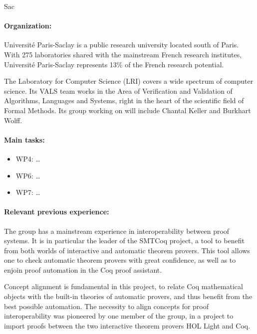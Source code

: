 \begin{sitedescription}{Sac}

\paragraph{Organization:}

Université Paris-Saclay is a public research university located south of
Paris. With 275 laboratories shared with the mainstream French research
institutes, Université Paris-Saclay represents 13\% of the French
research potential.

The Laboratory for Computer Science (LRI) covers a wide spectrum of
computer science. Its VALS team works in the Area of Verification and
Validation of Algorithms, Languages and Systems, right in the heart of
the scientific field of Formal Methods. Its group working on \pn will
include Chantal Keller and Burkhart Wolff.

\paragraph{Main tasks:}

\begin{itemize}
\item WP4: \dots
\item WP6: \dots
\item WP7: \dots
\end{itemize}

\begin{compactitem}
\item{} 
\end{compactitem}


\paragraph{Relevant previous experience:}

The group has a mainstream experience in interoperability between proof
systems. It is in particular the leader of the SMTCoq project, a tool to
benefit from both worlds of interactive and automatic theorem provers.
This tool allows one to check automatic theorem provers with great
confidence, as well as to enjoin proof automation in the Coq proof
assistant.

Concept alignment is fundamental in this project, to relate Coq
mathematical objects with the built-in theories of automatic provers,
and thus benefit from the best possible automation. The necessity to
align concepts for proof interoperability was pioneered by one member of
the group, in a project to import proofs between the two interactive
theorem provers HOL Light and Coq.


\end{sitedescription}
